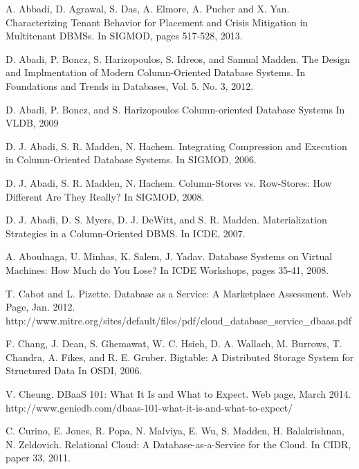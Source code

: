 
\begin{thebibliography}{1}





A. Abbadi, D. Agrawal, S. Das, A. Elmore, A. Pucher and X. Yan.
Characterizing Tenant Behavior for Placement and Crisis Mitigation in Multitenant DBMSs.
In SIGMOD, pages 517-528, 2013.


D. Abadi, P. Boncz, S. Harizopoulos, S. Idreos, and Samual Madden.
The Design and Implmentation of Modern Column-Oriented Database Systems.
In Foundations and Trends in Databases, Vol. 5. No. 3, 2012.


D. Abadi, P. Boncz, and S. Harizopoulos
Column-oriented Database Systems
In VLDB, 2009


D. J. Abadi, S. R. Madden, N. Hachem.
Integrating Compression and Execution in Column-Oriented Database Systems.
In SIGMOD, 2006.


D. J. Abadi, S. R. Madden, N. Hachem.
Column-Stores vs. Row-Stores: How Different Are They Really?
In SIGMOD, 2008.


D. J. Abadi, D. S. Myers, D. J. DeWitt, and S. R. Madden.
Materialization Strategies in a Column-Oriented DBMS.
In ICDE, 2007.


A. Aboulnaga, U. Minhas, K. Salem, J. Yadav.
Database Systems on Virtual Machines: How Much do You Lose? 
In ICDE Workshops, pages 35-41, 2008.


T. Cabot and L. Pizette.
Database as a Service: A Marketplace Assessment.
Web Page, Jan. 2012.
http://www.mitre.org/sites/default/files/pdf/cloud\_database\_service\_dbaas.pdf


F. Chang, J. Dean, S. Ghemawat, W. C. Hsieh, D. A. Wallach, M. Burrows, T. Chandra, A. Fikes, and R. E. Gruber.
Bigtable: A Distributed Storage System for Structured Data
In OSDI, 2006.


V. Cheung.
DBaaS 101: What It Is and What to Expect.
Web page, March 2014.
http://www.geniedb.com/dbaas-101-what-it-is-and-what-to-expect/


C. Curino, E. Jones, R. Popa, N. Malviya, E. Wu, S. Madden, H. Balakrishnan, N. Zeldovich.
Relational Cloud: A Database-as-a-Service for the Cloud.
In CIDR, paper 33, 2011.



\end{thebibliography}
